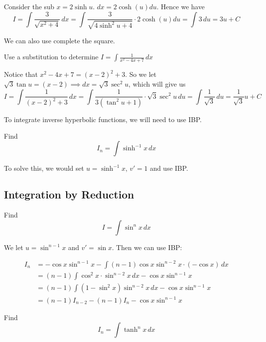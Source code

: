 \documentclass{article}
\newcommand{\f}[2]{\frac{#1}{#2}}
\newcommand{\arsinh}{\sinh^{-1}}
\newcommand{\intg}[2]{\int #1 \, d#2}
\theoremstyle{mytheoremstyle}
\theoremstyle{mytheoremstyle}
\theoremstyle{myproblemstyle}
\theoremstyle{myproblemstyle}
\begin{document}
    Consider the sub $x = 2\sinh{u}$. $dx = 2\cosh{(u)}du$. Hence we have \[I = \intg{\frac{3}{\sqrt{x^2 + 4}}}{x} = \int\frac{3}{\sqrt{4\sinh^2{u} + 4}} \cdot 2\cosh{(u)} du = \intg{3}{u} = 3u + C\]

    We can also use complete the square.

    \begin{example}
        Use a substitution to determine $I = \intg{\frac{1}{x^2 - 4x + 7}}{x}$
    \end{example}

    Notice that $x^2 - 4x + 7 = (x-2)^2 + 3$. So we let $\sqrt{3}\tan{u} = (x-2) \implies dx = \sqrt{3}\sec^2{u}$,  which will give us 
    \[I = \intg{\frac{1}{(x-2)^2 + 3}}{x} = \intg{\frac{1}{3(\tan^2{u} + 1)}\cdot \sqrt{3}\sec^2{u}}{u} = \intg{\frac{1}{\sqrt{3}}}{u} = \f{1}{\sqrt{3}}u + C\]

    To integrate inverse hyperbolic functions, we will need to use IBP.

    \begin{example}
        Find \[I_n = \intg{\arsinh{x}}{x}\]
    \end{example}

    To solve this, we would set $u = \arsinh{x}$, $v' = 1$ and use IBP.


    \subsection{Integration by Reduction}
    \begin{example}
        Find \[I = \intg{\sin^n{x}}{x}\]
    \end{example}

    We let $u = \sin^{n-1}{x}$ and $v' = \sin{x}$. Then we can use IBP:
    
    \begin{align*}
        I_n &= -\cos{x}\sin^{n-1}{x} - \intg{(n-1)\cos{x}\sin^{n-2}{x}\cdot (-\cos{x})}{x}\\
        &= (n-1)\intg{\cos^2{x} \cdot \sin^{n-2}{x}}{x} - \cos{x}\sin^{n-1}{x}\\
        &= (n-1)\intg{(1-\sin^2{x})\sin^{n-2}{x}}{x} - \cos{x}\sin^{n-1}{x}\\
        &= (n-1)I_{n-2} - (n-1)I_n - \cos{x}\sin^{n-1}{x}
    \end{align*}
    
    \begin{example}
        Find \[I_n = \intg{\tanh^n{x}}{x}\]
    \end{example}
\end{document}
